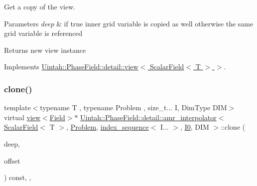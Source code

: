 Get a copy of the view. 


\begin{DoxyParams}{Parameters}
{\em deep} & if true inner grid variable is copied as well otherwise the same grid variable is referenced\\
\hline
\end{DoxyParams}
\begin{DoxyReturn}{Returns}
new view instance 
\end{DoxyReturn}


Implements \hyperlink{classUintah_1_1PhaseField_1_1detail_1_1view_3_01ScalarField_3_01T_01_4_01_4_a6e11243c9d776a7b703e524ea4151a16}{Uintah\+::\+Phase\+Field\+::detail\+::view$<$ Scalar\+Field$<$ T $>$ $>$}.

\mbox{\label{classUintah_1_1PhaseField_1_1detail_1_1amr__interpolator_3_01ScalarField_3_01T_01_4_00_01Problem64f2458f98b03e27672a091eecc4b696_a890e72b7dfe89f2a0f95bb76d5f7638b}} 
\subsubsection{\texorpdfstring{clone()}{clone()}\hspace{0.1cm}{\footnotesize\ttfamily [2/2]}}
{\footnotesize\ttfamily template$<$typename T , typename Problem , size\+\_\+t... I, Dim\+Type D\+IM$>$ \\
virtual \hyperlink{classUintah_1_1PhaseField_1_1detail_1_1view}{view}$<$\hyperlink{structUintah_1_1PhaseField_1_1ScalarField}{Field}$>$$\ast$ \hyperlink{classUintah_1_1PhaseField_1_1detail_1_1amr__interpolator}{Uintah\+::\+Phase\+Field\+::detail\+::amr\+\_\+interpolator}$<$ \hyperlink{structUintah_1_1PhaseField_1_1ScalarField}{Scalar\+Field}$<$ T $>$, \hyperlink{classUintah_1_1PhaseField_1_1Problem}{Problem}, \hyperlink{namespaceUintah_1_1PhaseField_a237de804d99512e50613aff7c94a9461}{index\+\_\+sequence}$<$ I... $>$, \hyperlink{namespaceUintah_1_1PhaseField_a547ce3002aa97fbd3ef3192a6eec8406abdd8ebcbdfd71d1125937e3012dc45fb}{I0}, D\+IM $>$\+::clone (\begin{DoxyParamCaption}\item[{bool}]{deep,  }\item[{const Int\+Vector \&}]{offset }\end{DoxyParamCaption}) const\hspace{0.3cm}{\ttfamily [inline]}, {\ttfamily [override]}, {\ttfamily [virtual]}}



